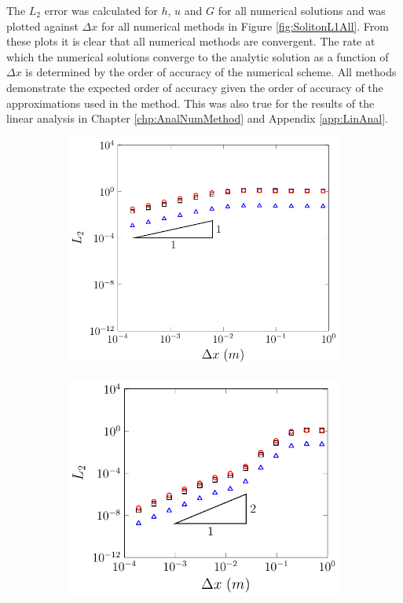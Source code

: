The $L_2$ error was calculated for $h$, $u$ and $G$ for all numerical solutions and was plotted against $\Delta x$ for all numerical methods in Figure \ref{fig:SolitonL1All}. From these plots it is clear that all numerical methods are convergent. The rate at which the numerical solutions converge to the analytic solution as a function of $\Delta x$ is determined by the order of accuracy of the numerical scheme. All methods demonstrate the expected order of accuracy given the order of accuracy of the approximations used in the method. This was also true for the results of the linear analysis in Chapter \ref{chp:AnalNumMethod} and Appendix \ref{app:LinAnal}. 
\begin{figure}
	\centering
	\begin{subfigure}{0.5\textwidth}
		\includegraphics[width=\textwidth]{./chp5/figures/Analytic/Soliton/L2/FDVM1.pdf}
		\vspace{0.5cm}
	\end{subfigure}%
	\begin{subfigure}{0.5\textwidth}
		\includegraphics[width=\textwidth]{./chp5/figures/Analytic/Soliton/L2/FDVM2.pdf}

\end{subfigure}
\end{figure}
